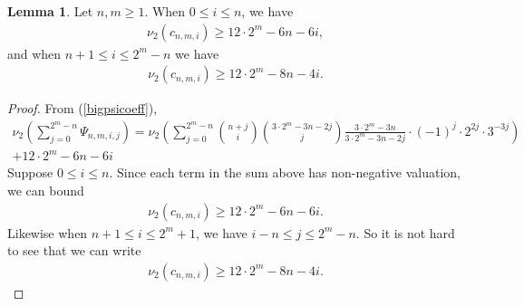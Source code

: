 \documentclass[10pt,a4paper]{amsart}
\numberwithin{equation}{section}
\theoremstyle{definition}
\newtheorem{Lemma}[Th]{Lemma}
\begin{document}
\begin{Lemma} \label{Lemma: hmcoeffsvals}
    Let $n,m \geq 1$. When $0 \leq i \leq n$, we have
    \begin{align*}
        \nu_{2}(c_{n,m,i}) \geq 12 \cdot 2^{m} - 6n - 6i,
    \end{align*}
    and when $n+1 \leq i \leq 2^{m}-n$ we have
    \begin{align*}
        \nu_{2}(c_{n,m,i}) \geq 12 \cdot 2^{m}-8n-4i.
    \end{align*}
\end{Lemma}
\begin{proof}
From (\ref{bigpsicoeff}),
    \begin{multline*}
        \nu_{2} \left( \sum_{j=0}^{2^{m}-n} \Psi_{n,m,i,j} \right) = \nu_{2} \left( \sum_{j=0}^{2^{m}-n} \binom{n+j}{i} \binom{3 \cdot 2^{m}-3n-2j}{j} \frac{3\cdot 2^{m}-3n}{3 \cdot 2^{m}-3n-2j} \cdot (-1)^{j} \cdot 2^{2j} \cdot 3^{-3j} \right) \\ + 12 \cdot 2^{m}-6n-6i
    \end{multline*}
    Suppose $0 \leq i \leq n$. Since each term in the sum above has non-negative valuation, we can bound
    \begin{align*}
        \nu_{2}(c_{n,m,i}) \geq 12 \cdot 2^{m} - 6n - 6i.
    \end{align*}
    Likewise when $n+1 \leq i \leq 2^{m}+1$, we have $i-n \leq j \leq 2^{m}-n$. So it is not hard to see that we can write
    \begin{align*}
        \nu_{2}(c_{n,m,i}) \geq 12 \cdot 2^{m}-8n-4i.
    \end{align*}
\end{proof}
\end{document}
